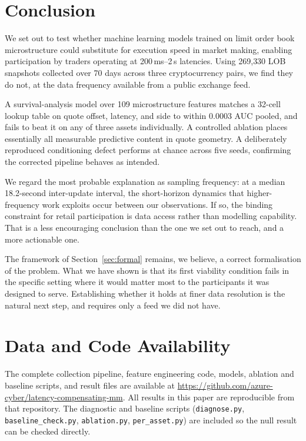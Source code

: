 \documentclass[11pt]{article}
\begin{document}
\section{Conclusion}

We set out to test whether machine learning models trained on limit order book
microstructure could substitute for execution speed in market making, enabling
participation by traders operating at 200\,ms--2\,s latencies. Using 269{,}330
LOB snapshots collected over 70 days across three cryptocurrency pairs, we find
they do not, at the data frequency available from a public exchange feed.

A survival-analysis model over 109 microstructure features matches a 32-cell
lookup table on quote offset, latency, and side to within 0.0003 AUC pooled, and
fails to beat it on any of three assets individually. A controlled ablation
places essentially all measurable predictive content in quote geometry. A
deliberately reproduced conditioning defect performs at chance across five
seeds, confirming the corrected pipeline behaves as intended.

We regard the most probable explanation as sampling frequency: at a median
18.2-second inter-update interval, the short-horizon dynamics that
higher-frequency work exploits occur between our observations. If so, the binding constraint for retail participation is data access rather
than modelling capability. That is a less encouraging conclusion than the one we
set out to reach, and a more actionable one.

The framework of Section~\ref{sec:formal} remains, we believe, a correct
formalisation of the problem. What we have shown is that its first viability
condition fails in the specific setting where it would matter most to the
participants it was designed to serve. Establishing whether it holds at finer
data resolution is the natural next step, and requires only a feed we did not
have.

\section*{Data and Code Availability}

The complete collection pipeline, feature engineering code, models, ablation and
baseline scripts, and result files are available at
\url{https://github.com/azure-cyber/latency-compensating-mm}. All results in
this paper are reproducible from that repository. The diagnostic and baseline
scripts (\texttt{diagnose.py}, \texttt{baseline\_check.py},
\texttt{ablation.py}, \texttt{per\_asset.py}) are included so the null result can
be checked directly.
\end{document}
